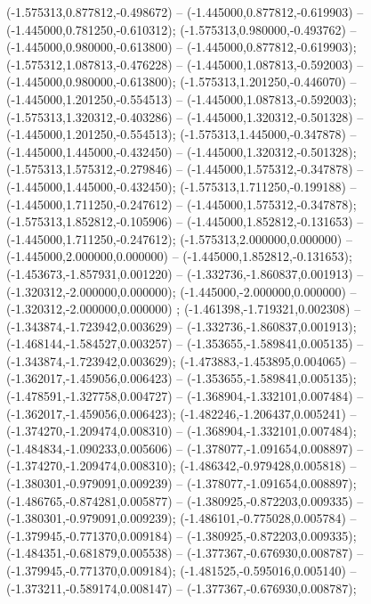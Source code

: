 (-1.575313,0.877812,-0.498672) -- (-1.445000,0.877812,-0.619903) -- (-1.445000,0.781250,-0.610312);
 (-1.575313,0.980000,-0.493762) -- (-1.445000,0.980000,-0.613800) -- (-1.445000,0.877812,-0.619903);
 (-1.575312,1.087813,-0.476228) -- (-1.445000,1.087813,-0.592003) -- (-1.445000,0.980000,-0.613800);
 (-1.575313,1.201250,-0.446070) -- (-1.445000,1.201250,-0.554513) -- (-1.445000,1.087813,-0.592003);
 (-1.575313,1.320312,-0.403286) -- (-1.445000,1.320312,-0.501328) -- (-1.445000,1.201250,-0.554513);
 (-1.575313,1.445000,-0.347878) -- (-1.445000,1.445000,-0.432450) -- (-1.445000,1.320312,-0.501328);
 (-1.575313,1.575312,-0.279846) -- (-1.445000,1.575312,-0.347878) -- (-1.445000,1.445000,-0.432450);
 (-1.575313,1.711250,-0.199188) -- (-1.445000,1.711250,-0.247612) -- (-1.445000,1.575312,-0.347878);
 (-1.575313,1.852812,-0.105906) -- (-1.445000,1.852812,-0.131653) -- (-1.445000,1.711250,-0.247612);
 (-1.575313,2.000000,0.000000) -- (-1.445000,2.000000,0.000000) -- (-1.445000,1.852812,-0.131653);
 (-1.453673,-1.857931,0.001220) -- (-1.332736,-1.860837,0.001913) -- (-1.320312,-2.000000,0.000000);
 (-1.445000,-2.000000,0.000000) -- (-1.320312,-2.000000,0.000000) ;
 (-1.461398,-1.719321,0.002308) -- (-1.343874,-1.723942,0.003629) -- (-1.332736,-1.860837,0.001913);
 (-1.468144,-1.584527,0.003257) -- (-1.353655,-1.589841,0.005135) -- (-1.343874,-1.723942,0.003629);
 (-1.473883,-1.453895,0.004065) -- (-1.362017,-1.459056,0.006423) -- (-1.353655,-1.589841,0.005135);
 (-1.478591,-1.327758,0.004727) -- (-1.368904,-1.332101,0.007484) -- (-1.362017,-1.459056,0.006423);
 (-1.482246,-1.206437,0.005241) -- (-1.374270,-1.209474,0.008310) -- (-1.368904,-1.332101,0.007484);
 (-1.484834,-1.090233,0.005606) -- (-1.378077,-1.091654,0.008897) -- (-1.374270,-1.209474,0.008310);
 (-1.486342,-0.979428,0.005818) -- (-1.380301,-0.979091,0.009239) -- (-1.378077,-1.091654,0.008897);
 (-1.486765,-0.874281,0.005877) -- (-1.380925,-0.872203,0.009335) -- (-1.380301,-0.979091,0.009239);
 (-1.486101,-0.775028,0.005784) -- (-1.379945,-0.771370,0.009184) -- (-1.380925,-0.872203,0.009335);
 (-1.484351,-0.681879,0.005538) -- (-1.377367,-0.676930,0.008787) -- (-1.379945,-0.771370,0.009184);
 (-1.481525,-0.595016,0.005140) -- (-1.373211,-0.589174,0.008147) -- (-1.377367,-0.676930,0.008787);

